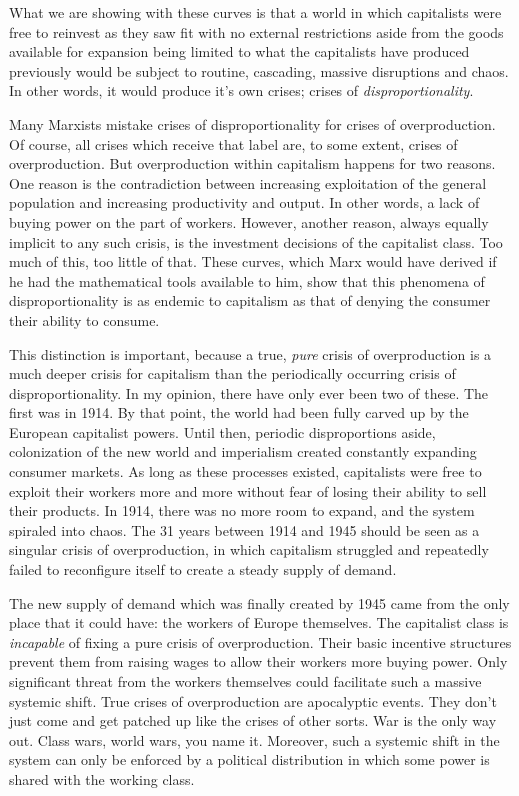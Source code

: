\documentclass{article}
\theoremstyle{theorem}
\begin{document}
What we are showing with these curves is that a world in which capitalists were free to reinvest as they saw fit with no external restrictions aside from the goods available for expansion being limited to what the capitalists have produced previously would be subject to routine, cascading, massive disruptions and chaos. In other words, it would produce it's own crises; crises of \emph{disproportionality}.  \par
Many Marxists mistake crises of disproportionality for crises of overproduction. Of course, all crises which receive that label are, to some extent, crises of overproduction. But overproduction within capitalism happens for two reasons. One reason is the contradiction between increasing exploitation of the general population and increasing productivity and output. In other words, a lack of buying power on the part of workers. However, another reason, always equally implicit to any such crisis, is the investment decisions of the capitalist class. Too much of this, too little of that. These curves, which Marx would have derived if he had the mathematical tools available to him, show that this phenomena of disproportionality is as endemic to capitalism as that of denying the consumer their ability to consume. \par 
This distinction is important, because a true, \emph{pure} crisis of overproduction is a much deeper crisis for capitalism than the periodically occurring crisis of disproportionality. In my opinion, there have only ever been two of these. The first was in 1914. By that point, the world had been fully carved up by the European capitalist powers. Until then, periodic disproportions aside, colonization of the new world and imperialism created constantly expanding consumer markets. As long as these processes existed, capitalists were free to exploit their workers more and more without fear of losing their ability to sell their products. In 1914, there was no more room to expand, and the system spiraled into chaos. The 31 years between 1914 and 1945 should be seen as a singular crisis of overproduction, in which capitalism struggled and repeatedly failed to reconfigure itself to create a steady supply of demand. \par 
The new supply of demand which was finally created by 1945 came from the only place that it could have: the workers of Europe themselves. The capitalist class is \emph{incapable} of fixing a pure crisis of overproduction. Their basic incentive structures prevent them from raising wages to allow their workers more buying power. Only significant threat from the workers themselves could facilitate such a massive systemic shift. True crises of overproduction are apocalyptic events. They don't just come and get patched up like the crises of other sorts. War is the only way out. Class wars, world wars, you name it. Moreover, such a systemic shift in the system can only be enforced by a political distribution in which some power is shared with the working class. \par 
\end{document}
